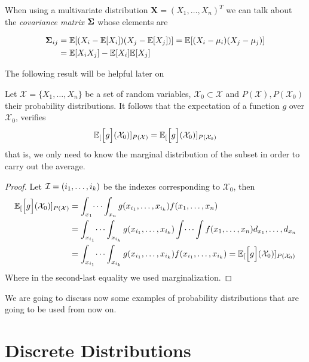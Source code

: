When using a multivariate distribution \(\bm{X} = (X_1,\dots,X_n)^T\) we can talk about the \emph{covariance
  matrix} \(\bm{\Sigma} \) whose elements are

\[
\begin{aligned}
\bm{\Sigma}_{ij} &= \mathbb{E}[ (X_i - \mathbb{E}[X_i])
(X_j - \mathbb{E}[X_j]) ] = \mathbb{E}[(X_i - \mu_i)(X_j - \mu_j)]\\
&=\mathbb{E}[X_iX_j]-\mathbb{E}[X_i]\mathbb{E}[X_j]
\end{aligned}
\]

The following result will be helpful later on

\begin{proposition} \label{prop:expectation_over_marginal}
  Let \(\mathcal{X} = \{X_1,\dots,X_n\}\) be a set of random variables,
  \(\mathcal{X}_{0} \subset \mathcal{X}\) and \(P(\mathcal{X}), P(\mathcal{X}_{0})\)
  their probability distributions.
  It follows that the expectation of a function \(g\) over \(\mathcal{X}_0\), verifies
    \[
      \mathbb{E}_{[}\Big[g\Big](\mathcal{X}_0)]_{P(\mathcal{X})} = \mathbb{E}_{[}\Big[g\Big](\mathcal{X}_0)]_{P(\mathcal{X}_0)}
    \]
    that is, we only need to know the marginal distribution of the subset in
    order to carry out the average.
\end{proposition}

\begin{proof}
  Let \(\mathcal{I} = (i_{1}, \dots, i_{k})\) be the indexes corresponding to \(\mathcal{X}_{0}\), then
  \[
    \begin{aligned}
      \mathbb{E}_{[}\Big[g\Big](\mathcal{X}_{0})]_{P(\mathcal{X})} &= \int_{x_{1}}\dots\int_{x_{n}}g(x_{i_{1}},\dots,x_{i_{k}})f(x_{1},\dots,x_{n}) \\
      &= \int_{x_{i_{1}}}\dots\int_{x_{i_{k}}} g(x_{i_{1}},\dots,x_{i_{k}}) \int \dots \int f(x_{1},\dots,x_{n}) d_{x_{1}},\dots,d_{x_{n}}\\
      &= \int_{x_{i_{1}}}\dots\int_{x_{i_{k}}} g(x_{i_{1}},\dots,x_{i_{k}}) f(x_{i_{1}},\dots,x_{i_{k}}) =  \mathbb{E}_{[}\Big[g\Big](\mathcal{X}_{0})]_{P(\mathcal{X}_{0})} \\
      \end{aligned}
  \]
Where in the second-last equality we used marginalization.
\end{proof}

We are going to discuss now some examples of probability distributions that are
going to be used from now on.

\section{Discrete Distributions}


